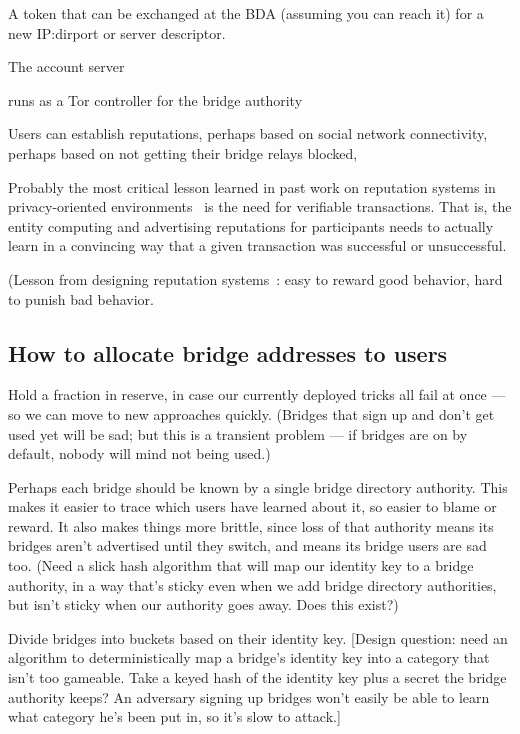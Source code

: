 \documentclass{llncs}
\begin{document}
A token that can be exchanged at the BDA (assuming you
can reach it) for a new IP:dirport or server descriptor.

The account server

runs as a Tor controller for the bridge authority

Users can establish reputations, perhaps based on social network
connectivity, perhaps based on not getting their bridge relays blocked,

Probably the most critical lesson learned in past work on reputation
systems in privacy-oriented environments~\cite{p2p-econ} is the need for
verifiable transactions. That is, the entity computing and advertising
reputations for participants needs to actually learn in a convincing
way that a given transaction was successful or unsuccessful.

(Lesson from designing reputation systems~\cite{p2p-econ}: easy to
reward good behavior, hard to punish bad behavior.

\subsection{How to allocate bridge addresses to users}

Hold a fraction in reserve, in case our currently deployed tricks
all fail at once --- so we can move to new approaches quickly.
(Bridges that sign up and don't get used yet will be sad; but this
is a transient problem --- if bridges are on by default, nobody will
mind not being used.)

Perhaps each bridge should be known by a single bridge directory
authority. This makes it easier to trace which users have learned about
it, so easier to blame or reward. It also makes things more brittle,
since loss of that authority means its bridges aren't advertised until
they switch, and means its bridge users are sad too.
(Need a slick hash algorithm that will map our identity key to a
bridge authority, in a way that's sticky even when we add bridge
directory authorities, but isn't sticky when our authority goes
away. Does this exist?)

Divide bridges into buckets based on their identity key.
[Design question: need an algorithm to deterministically map a bridge's
identity key into a category that isn't too gameable. Take a keyed
hash of the identity key plus a secret the bridge authority keeps?
An adversary signing up bridges won't easily be able to learn what
category he's been put in, so it's slow to attack.]
\end{document}
